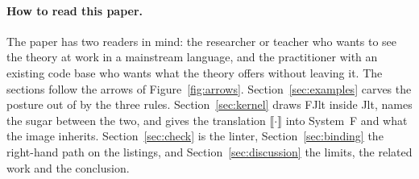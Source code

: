 \paragraph{How to read this paper.}
The paper has two readers in mind: the researcher or teacher who wants to see the theory at work in a mainstream language, and the practitioner with an existing code base who wants what the theory offers without leaving it.
The sections follow the arrows of Figure~\ref{fig:arrows}.
Section~\ref{sec:examples} carves the posture out of  by the three rules.
Section~\ref{sec:kernel} draws FJlt inside Jlt, names the sugar between the two, and gives the translation $\llbracket\cdot\rrbracket$ into System~F and what the image inherits.
Section~\ref{sec:check} is the linter, Section~\ref{sec:binding} the right-hand path on the listings, and Section~\ref{sec:discussion} the limits, the related work and the conclusion.
